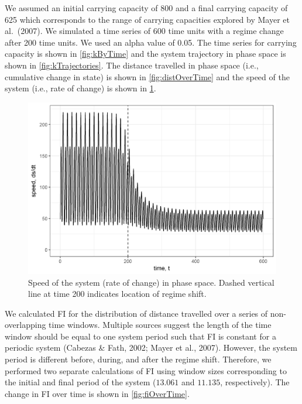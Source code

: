\documentclass[12pt,twoside,openany]{reedthesis}
\begin{document}
We assumed an initial carrying capacity of 800 and a final carrying capacity of 625 which corresponds to the range of carrying capacities explored by Mayer et al.~(2007). We simulated a time series of 600 time units with a regime change after 200 time units. We used an alpha value of 0.05. The time series for carrying capacity is shown in \ref{fig:kByTime} and the system trajectory in phase space is shown in \ref{fig:kTrajectories}. The distance travelled in phase space (i.e., cumulative change in state) is shown in \ref{fig:distOverTime} and the speed of the system (i.e., rate of change) is shown in \ref{fig:dsdtOverTime}.
\begin{figure}
\includegraphics[width=27.08in]{./chapterFiles/fiGuide/figures/dsdtOverTime} \caption{Speed of the system (rate of change) in phase space. Dashed vertical line at time 200 indicates location of regime shift.}\label{fig:dsdtOverTime}
\end{figure}
We calculated FI for the distribution of distance travelled over a series of non-overlapping time windows. Multiple sources suggest the length of the time window should be equal to one system period such that FI is constant for a periodic system (Cabezas \& Fath, 2002; Mayer et al., 2007). However, the system period is different before, during, and after the regime shift. Therefore, we performed two separate calculations of FI using window sizes corresponding to the initial and final period of the system (\(13.061\) and \(11.135\), respectively). The change in FI over time is shown in \ref{fig:fiOverTime}.
\end{document}
